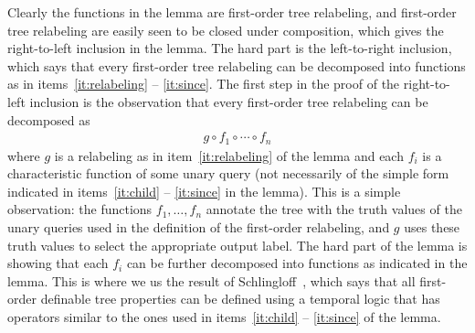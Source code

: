 Clearly the functions in the lemma are first-order tree relabeling, and first-order tree relabeling are easily seen to be closed under composition, which gives the right-to-left inclusion in the lemma. The hard part is the left-to-right inclusion, which says that every first-order tree relabeling can be decomposed into functions as in items~\ref{it:relabeling} -- \ref{it:since}. 
The first  step in the proof of  the right-to-left inclusion is the observation that  every first-order tree relabeling can be decomposed as 
\begin{align*}
    g \circ f_1 \circ \cdots \circ f_n
\end{align*}
where $g$ is a relabeling as in item~\ref{it:relabeling} of the lemma and each $f_i$ is a  characteristic function of some unary query (not necessarily of the simple form indicated in items~\ref{it:child} -- \ref{it:since} in the lemma). This is a simple observation: the functions $f_1,\ldots,f_n$ annotate the tree with the truth values of the unary queries used in the definition of the  first-order relabeling, and $g$ uses these truth values to select the appropriate output label. The hard part of the lemma is showing that each $f_i$  can be further decomposed into functions as indicated in the lemma. This is where we us the result of Schlingloff~\cite[Theorem 2.6]{schlingloff1992expressive}, which says that all first-order definable tree properties can be defined using a temporal logic that has operators similar to the ones used in items~\ref{it:child} -- \ref{it:since} of the lemma. 

